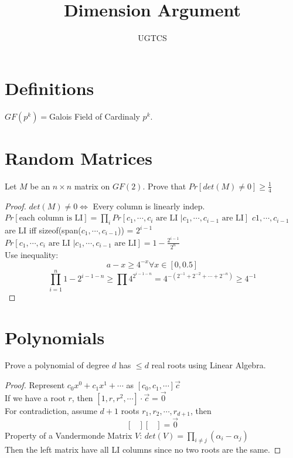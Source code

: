 \documentclass[12pt]{article}
\begin{document}
 
 
 
\title{Dimension Argument}
\author{UGTCS}
 
\maketitle
\section{Definitions}
$GF(p^k) = $Galois Field of Cardinaly $p^k$.

\section{Random Matrices}
Let $M$ be an $n \times n$ matrix on $GF(2)$. Prove that $Pr[det(M) \not = 0] \geq \frac{1}{4}$

\begin{proof}
	$det(M) \not = 0 \Longleftrightarrow $ Every column is linearly indep.\\
	\newline
	$Pr[\text{each column is LI}] = \prod_{i}Pr[c_1, \cdots, c_i \text{ are LI } | c_1, \cdots, c_{i - 1} \text{ are LI}]$
	$c1, \cdots, c_{i - 1} $ are LI iff sizeof(span($c_1, \cdots, c_{i - 1}$)) = $2^{i - 1}$\\
	$Pr[c_1, \cdots, c_i \text{ are LI } | c_1, \cdots, c_{i - 1} \text{ are LI}] = 1 - \frac{2^{i - 1}}{2 ^ n}$\\
	Use inequality:
	$$a - x \geq 4^{-x} \forall x \in [0, 0.5]$$
	$$\prod_{i = 1}^{n}{1 - 2^{i - 1 - n}} \geq \prod{4^{2^{i - 1 - n}}} = 4^{-(2^{-1} + 2^{-2} + \cdots + 2^{-n})} \geq 4^{-1}$$
\end{proof}


\section{Polynomials}
Prove a polynomial of degree $d$ has $\leq d$ real roots using Linear Algebra.

\begin{proof}
	Represent $c_0x^0 + c_1x^1 + \cdots$ as $[c_0, c_1, \cdots] \vec{c}$\\
	If we have a root $r$, then $[1, r, r^2, \cdots] \cdot \vec{c} = \vec{0}$\\
	For contradiction, assume $d + 1$ roots $r_1, r_2, \cdots, r_{d + 1}$, then $$\begin{bmatrix}
	
	\end{bmatrix} \begin{bmatrix}
	
	\end{bmatrix} = \vec{0}$$
	Property of a Vandermonde Matrix $V$: $det(V) = \prod_{i \not = j}(\alpha_i - \alpha_j)$\\
	Then the left matrix have all LI columns since no two roots are the same.
\end{proof}
\end{document}
